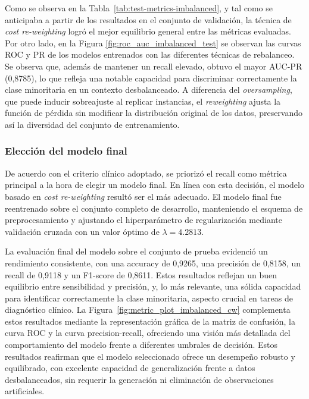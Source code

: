 \begin{multicols}{2}
Como se observa en la Tabla~\ref{tab:test-metrics-imbalanced}, y tal como se anticipaba a partir de los resultados en el conjunto de validación, la técnica de \textit{cost re-weighting} logró el mejor equilibrio general entre las métricas evaluadas. Por otro lado, en la Figura \ref{fig:roc_auc_imbalanced_test} se observan las curvas ROC y PR de los modelos entrenados con las diferentes técnicas de rebalanceo. Se observa que, además de mantener un recall elevado, obtuvo el mayor AUC-PR (0,8785), lo que refleja una notable capacidad para discriminar correctamente la clase minoritaria en un contexto desbalanceado.  A diferencia del \textit{oversampling}, que puede inducir sobreajuste al replicar instancias, el \textit{reweighting} ajusta la función de pérdida sin modificar la distribución original de los datos, preservando así la diversidad del conjunto de entrenamiento.

\subsubsection{Elección del modelo final}

De acuerdo con el criterio clínico adoptado, se priorizó el recall como métrica principal a la hora de elegir un modelo final. En línea con esta decisión, el modelo basado en \textit{cost re-weighting} resultó ser el más adecuado. El modelo final fue reentrenado sobre el conjunto completo de desarrollo, manteniendo el esquema de preprocesamiento y ajustando el hiperparámetro de regularización mediante validación cruzada con un valor óptimo de \(\lambda = 4.2813\).

La evaluación final del modelo sobre el conjunto de prueba evidenció un rendimiento consistente, con una accuracy de 0,9265, una precisión de 0,8158, un recall de 0,9118 y un F1-score de 0,8611. Estos resultados reflejan un buen equilibrio entre sensibilidad y precisión, y, lo más relevante, una sólida capacidad para identificar correctamente la clase minoritaria, aspecto crucial en tareas de diagnóstico clínico. La Figura~\ref{fig:metric_plot_imbalanced_cw} complementa estos resultados mediante la representación gráfica de la matriz de confusión, la curva ROC y la curva precision-recall, ofreciendo una visión más detallada del comportamiento del modelo frente a diferentes umbrales de decisión. Estos resultados reafirman que el modelo seleccionado ofrece un desempeño robusto y equilibrado, con excelente capacidad de generalización frente a datos desbalanceados, sin requerir la generación ni eliminación de observaciones artificiales.



\end{multicols}
